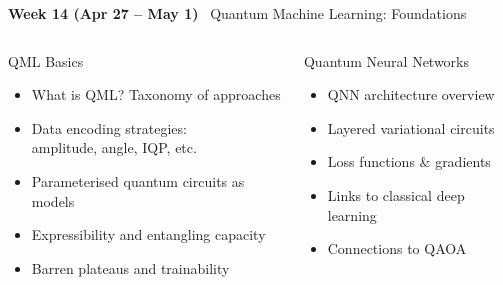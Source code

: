 \documentclass[aspectratio=169,12pt]{beamer}
\newcommand{\week}[1]{\textcolor{qgold}{\textbf{#1}}}
\begin{document}
\begin{frame}{\week{Week 14 (Apr 27 -- May 1)} \ Quantum Machine Learning: Foundations}
  \begin{columns}[T]
      \begin{block}{QML Basics}
        \begin{itemize}
          \item What is QML? Taxonomy of approaches
          \item Data encoding strategies:\\
                amplitude, angle, IQP, etc.
          \item Parameterised quantum circuits as models
          \item Expressibility and entangling capacity
          \item Barren plateaus and trainability
        \end{itemize}
      \end{block}
      \begin{block}{Quantum Neural Networks}
        \begin{itemize}
          \item QNN architecture overview
          \item Layered variational circuits
          \item Loss functions \& gradients
          \item Links to classical deep learning
          \item Connections to QAOA
        \end{itemize}
      \end{block}
  \end{columns}
\end{frame}
\end{document}

